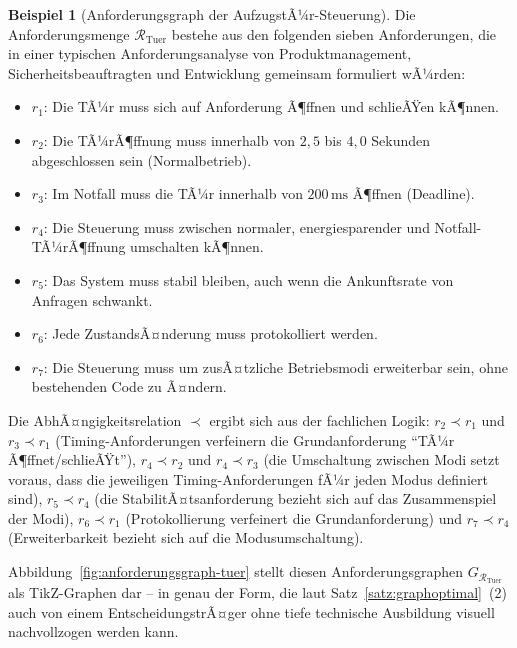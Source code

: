 ﻿\documentclass[a4paper,12pt]{report}
\theoremstyle{definition}
\newtheorem{beispiel}{Beispiel}[section]
\begin{document}
\begin{beispiel}[Anforderungsgraph der AufzugstÃ¼r-Steuerung]
\label{bsp:aufzugstuer-graph}
Die Anforderungsmenge $\mathcal{R}_{\text{Tuer}}$ bestehe aus den folgenden
sieben Anforderungen, die in einer typischen Anforderungsanalyse von
Produktmanagement, Sicherheitsbeauftragten und Entwicklung gemeinsam
formuliert wÃ¼rden:
\begin{itemize}
  \item $r_1$: Die TÃ¼r muss sich auf Anforderung Ã¶ffnen und schlieÃŸen
  kÃ¶nnen.
  \item $r_2$: Die TÃ¼rÃ¶ffnung muss innerhalb von $2{,}5$ bis $4{,}0$
  Sekunden abgeschlossen sein (Normalbetrieb).
  \item $r_3$: Im Notfall muss die TÃ¼r innerhalb von $200\,\text{ms}$
  Ã¶ffnen (Deadline).
  \item $r_4$: Die Steuerung muss zwischen normaler, energiesparender und
  Notfall-TÃ¼rÃ¶ffnung umschalten kÃ¶nnen.
  \item $r_5$: Das System muss stabil bleiben, auch wenn die Ankunftsrate
  von Anfragen schwankt.
  \item $r_6$: Jede ZustandsÃ¤nderung muss protokolliert werden.
  \item $r_7$: Die Steuerung muss um zusÃ¤tzliche Betriebsmodi erweiterbar
  sein, ohne bestehenden Code zu Ã¤ndern.
\end{itemize}
Die AbhÃ¤ngigkeitsrelation $\prec$ ergibt sich aus der fachlichen Logik:
$r_2 \prec r_1$ und $r_3 \prec r_1$ (Timing-Anforderungen verfeinern die
Grundanforderung ``TÃ¼r Ã¶ffnet/schlieÃŸt''), $r_4 \prec r_2$ und $r_4 \prec
r_3$ (die Umschaltung zwischen Modi setzt voraus, dass die jeweiligen
Timing-Anforderungen fÃ¼r jeden Modus definiert sind), $r_5 \prec r_4$ (die
StabilitÃ¤tsanforderung bezieht sich auf das Zusammenspiel der Modi),
$r_6 \prec r_1$ (Protokollierung verfeinert die Grundanforderung) und
$r_7 \prec r_4$ (Erweiterbarkeit bezieht sich auf die Modusumschaltung).
\end{beispiel}

Abbildung~\ref{fig:anforderungsgraph-tuer} stellt diesen Anforderungsgraphen
$G_{\mathcal{R}_{\text{Tuer}}}$ als TikZ-Graphen dar -- in genau der Form,
die laut Satz~\ref{satz:graphoptimal}~(2) auch von einem
EntscheidungstrÃ¤ger ohne tiefe technische Ausbildung visuell nachvollzogen
werden kann.
\end{document}
